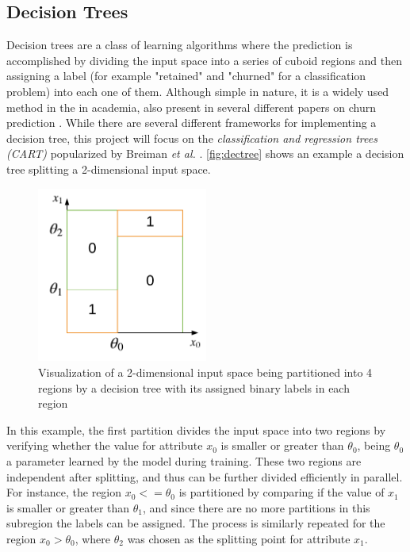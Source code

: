 \documentclass{kththesis}
\begin{document}
\subsection{Decision Trees}
Decision trees are a class of learning algorithms where the prediction is accomplished by dividing the input space into a series of cuboid regions and then assigning a label (for example "retained" and "churned" for a classification problem) into each one of them. Although simple in nature, it is a widely used method in the in academia, also present in several different papers on churn prediction \citep{Pudipeddi2014}\citep{Hassouna2015} \citep{Ballings2012} \citep{Khan2015}. While there are several different frameworks for implementing a decision tree, this project will focus on the \emph{classification and regression trees (CART)} popularized by Breiman \emph{et al.} \citep{breiman1984classification}. \autoref{fig:dectree} shows an example a decision tree splitting a 2-dimensional input space.  

\begin{figure}[h]
    \centering
    \includegraphics[width=0.5\textwidth,keepaspectratio]{figures/dectree.pdf}
    \caption{Visualization of a 2-dimensional input space being partitioned into 4 regions by a decision tree with its assigned binary labels in each region}
    \label{fig:dectree}
\end{figure}

In this example, the first partition divides the input space into two regions by verifying whether the value for attribute $x_0$ is smaller or greater than $\theta_0$, being $\theta_0$ a parameter learned by the model during training. These two regions are independent after splitting, and thus can be further divided efficiently in parallel. For instance, the region $x_0 <= \theta_0$ is partitioned by comparing if the value of $x_1$ is smaller or greater than $\theta_1$, and since there are no more partitions in this subregion the labels can be assigned. The process is similarly repeated for the region  $x_0 > \theta_0$, where $\theta_2$ was chosen as the splitting point for attribute $x_1$.
 
\end{document}
